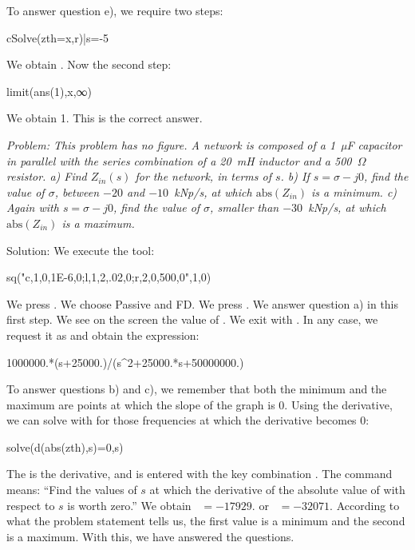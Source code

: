 To answer question e), we require two steps:

\begin{entry}
cSolve(zth=x,r)|s=-5
\end{entry}

We obtain . Now the second step:

\begin{entry}
limit(ans(1),x,∞)
\end{entry}

We obtain 1. This is the correct answer.


\emph{Problem: This problem has no figure. A network is composed of
a 1~µF capacitor in parallel with the series combination of a 20~mH
inductor and a 500~$\Omega$ resistor. a) Find $Z_{in}(s)$ for the
network, in terms of $s$. b) If $s = \sigma - j0$, find the value of
$\sigma$, between $-20$ and $-10$~kNp/s, at which
$\mathrm{abs}(Z_{in})$ is a minimum. c) Again with
$s = \sigma - j0$, find the value of $\sigma$, smaller than
$-30$~kNp/s, at which $\mathrm{abs}(Z_{in})$ is a maximum.}

Solution: We execute the tool:

\begin{entry}
sq\thevenin("c,1,0,1E-6,0;l,1,2,.02,0;r,2,0,500,0",1,0)
\end{entry}

We press . We choose Passive and FD. We press
. We answer question a) in this first step. We see on the
screen the value of . We exit with . In any
case, we request it as  and obtain the expression:

\begin{entry}
1000000.*(s+25000.)/(s^2+25000.*s+50000000.)
\end{entry}

To answer questions b) and c), we remember that both the minimum and
the maximum are points at which the slope of the graph is 0. Using
the derivative, we can solve with  for those frequencies
at which the derivative becomes 0:

\begin{entry}
solve(d(abs(zth),s)=0,s)
\end{entry}

The  is the derivative, and is entered with the key
combination  . The command means: ``Find the values
of $s$ at which the derivative of the absolute value of 
with respect to $s$ is worth zero.'' We obtain ~$= -17929.$
or ~$= -32071.$ According to what the problem statement
tells us, the first value is a minimum and the second is a maximum.
With this, we have answered the questions.


